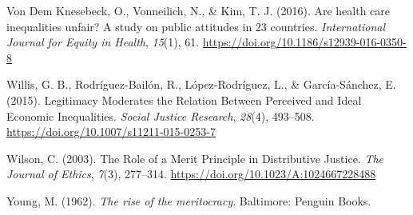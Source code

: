 \documentclass[
  12pt,
]{article}
\newlength{\cslhangindent}
\newenvironment{CSLReferences}[2] %
 {\begin{list}{}{%
  \setlength{\itemindent}{0pt}
  \setlength{\leftmargin}{0pt}
  \setlength{\parsep}{0pt}
  \ifodd #1
   \setlength{\leftmargin}{\cslhangindent}
   \setlength{\itemindent}{-1\cslhangindent}
  \fi
  \setlength{\itemsep}{#2\baselineskip}}}
 {\end{list}}
\begin{document}
\begin{CSLReferences}{1}{0}
Von Dem Knesebeck, O., Vonneilich, N., \& Kim, T. J. (2016). Are health
care inequalities unfair? {A} study on public attitudes in 23 countries.
\emph{International Journal for Equity in Health}, \emph{15}(1), 61.
\url{https://doi.org/10.1186/s12939-016-0350-8}

Willis, G. B., Rodríguez-Bailón, R., López-Rodríguez, L., \&
García-Sánchez, E. (2015). Legitimacy {Moderates} the {Relation Between
Perceived} and {Ideal Economic Inequalities}. \emph{Social Justice
Research}, \emph{28}(4), 493--508.
\url{https://doi.org/10.1007/s11211-015-0253-7}

Wilson, C. (2003). The {Role} of a {Merit Principle} in {Distributive
Justice}. \emph{The Journal of Ethics}, \emph{7}(3), 277--314.
\url{https://doi.org/10.1023/A:1024667228488}

Young, M. (1962). \emph{The rise of the meritocracy}. Baltimore: Penguin
Books.

\end{CSLReferences}
\end{document}
